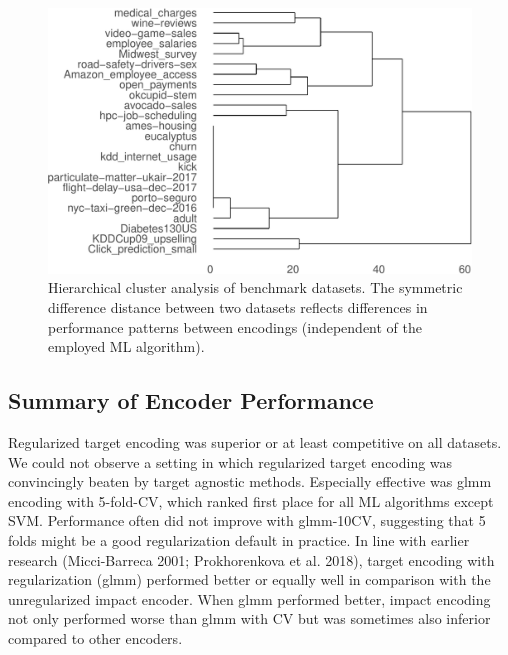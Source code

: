 \documentclass[smallextended]{svjour3}       %
\begin{document}
\begin{figure}[!h]
\includegraphics[width=\textwidth]{dendrogram-1} \caption{Hierarchical cluster analysis of benchmark datasets. The symmetric difference distance between two datasets reflects differences in performance patterns between encodings (independent of the employed ML algorithm).}\label{fig:dendrogram}
\end{figure}

\hypertarget{summary-of-encoder-performance}{%
\subsection{Summary of Encoder Performance}\label{summary-of-encoder-performance}}

Regularized target encoding was superior or at least competitive on all datasets.
We could not observe a setting in which regularized target encoding was convincingly beaten by target agnostic methods.
Especially effective was glmm encoding with 5-fold-CV, which ranked first place for all ML algorithms except SVM.
Performance often did not improve with glmm-10CV, suggesting that 5 folds might be a good regularization default in practice.
In line with earlier research (Micci-Barreca 2001; Prokhorenkova et al. 2018), target encoding with regularization (glmm) performed better or equally well in comparison with the unregularized impact encoder.
When glmm performed better, impact encoding not only performed worse than glmm with CV but was sometimes also inferior compared to other encoders.
\end{document}
